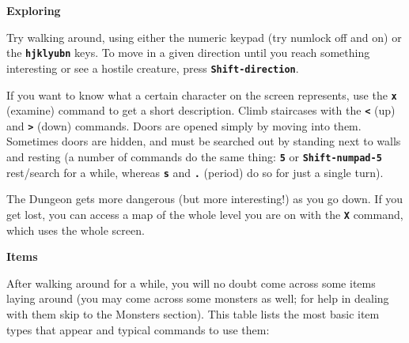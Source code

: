 \documentclass[a4paper,10pt]{article}
\newcommand{\key}[1]{{{\texttt{\textbf{#1}}}}} %
\newcommand{\sex}[1]{{{\textbf{#1}}}} %
\newcommand{\para}{\vspace{1.5ex}}
\begin{document}
\sex{Exploring} \para

Try walking around, using either the numeric keypad (try numlock off and on) 
or the \key{hjklyubn} keys. To move in a given direction until you reach 
something interesting or see a hostile creature, press \key{Shift-direction}. 

If you want to know what a certain character on the screen represents, use the 
\key{x} (examine) command to get a short description. Climb staircases with
the \key{<} (up) and \key{>} (down) commands. Doors are opened simply by 
moving into them. Sometimes doors are hidden, and must be searched out by 
standing next to walls and resting (a number of commands do the same thing: 
\key{5} or \key{Shift-numpad-5} rest/search for a while, whereas \key{s} and 
\key{.} (period) do so for just a single turn).

The Dungeon gets more dangerous (but more interesting!) as you go down. If you 
get lost, you can access a map of the whole level you are on with the \key{X} 
command, which uses the whole screen. 

\para\para

\sex{Items} \para 

After walking around for a while, you will no doubt come across some items 
laying around (you may come across some monsters as well; for help in dealing 
with them skip to the Monsters section). This table lists the most basic item
types that appear and typical commands to use them:

\para
\end{document}
